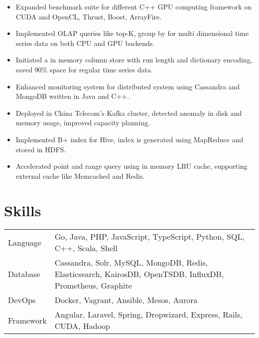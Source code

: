 \documentclass[11pt, letterpaper]{simple-cv}
\begin{document}
\begin{itemize}
  \item Expanded benchmark suite for different C++ GPU computing framework on CUDA and OpenCL, Thrust, Boost, ArrayFire.
  \item Implemented OLAP queries like top-K, group by for multi dimensional time series data on both CPU and GPU backends.
  \item Initiated a in memory column store with run length and dictionary encoding, saved 90\% space for regular time series data.
\end{itemize}


\begin{itemize}
  \item Enhanced monitoring system for distributed system using Cassandra and MongoDB written in Java and C++.
  \item Deployed in China Telecom's Kafka cluster, detected anomaly in disk and memory usage, improved capacity planning.
\end{itemize}


\begin{itemize}
  \item Implemented B+ index for Hive, index is generated using MapReduce and stored in HDFS.
  \item Accelerated point and range query using in memory LRU cache, supporting external cache like Memcached and Redis.
\end{itemize}


\section{Skills}
\begin{flushleft}
\begin{tabular}{@{}ll@{}}
 Language &  Go, Java, PHP, JavaScript, TypeScript, Python, SQL, C++, Scala, Shell\\
 Database & Cassandra, Solr, MySQL, MongoDB, Redis, Elasticsearch, KairosDB, OpenTSDB, InfluxDB, Prometheus, Graphite\\
 DevOps & Docker, Vagrant, Ansible, Mesos, Aurora\\
 Framework & Angular, Laravel, Spring, Dropwizard, Express, Rails, CUDA, Hadoop
\end{tabular}
\end{flushleft}
\end{document}
